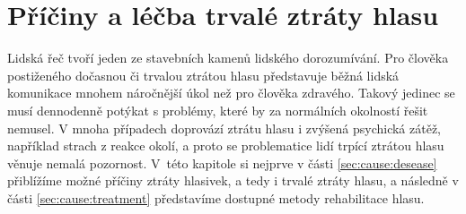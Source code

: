 \chapter{Příčiny a léčba trvalé ztráty hlasu}
\label{ch:cause}

Lidská řeč tvoří jeden ze stavebních kamenů lidského dorozumívání. Pro člověka
postiženého dočasnou či trvalou ztrátou hlasu představuje běžná lidská
komunikace mnohem náročnější úkol než pro člověka zdravého. Takový jedinec se
musí dennodenně potýkat s problémy, které by za normálních okolností řešit
nemusel. V mnoha případech doprovází ztrátu hlasu i zvýšená psychická zátěž,
například strach z reakce okolí, a proto se problematice lidí trpící ztrátou
hlasu věnuje nemalá pozornost. V~této kapitole si nejprve v části
\ref{sec:cause:desease} přiblížíme možné příčiny ztráty hlasivek, a tedy i
trvalé ztráty hlasu, a následně v části \ref{sec:cause:treatment} představíme
dostupné metody rehabilitace hlasu.



% 
% 
